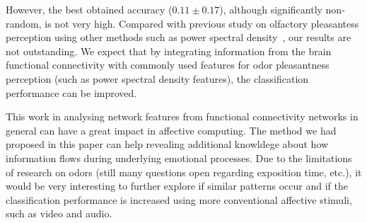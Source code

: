 However, the best obtained accuracy ($0.11 \pm 0.17$), although significantly non-random, is not very high. Compared with previous study on olfactory pleasantess perception using other methods such as power spectral density~\cite{kroupi2014eeg}, our results are not outstanding. We expect that by integrating information from the brain functional connectivity with commonly used features for odor pleasantness perception (such as power spectral density features), the classification performance can be improved. 

This work in analysing network features from functional connectivity networks in general can have a great impact in affective computing. The method we had proposed in this paper can help revealing additional knowldege about how information flows during underlying emotional processes. Due to the limitations of research on odors (still many questions open regarding exposition time, etc.), it would be very interesting to further explore if similar patterns occur and if the classification performance is increased using more conventional affective stimuli, such as video and audio.   



